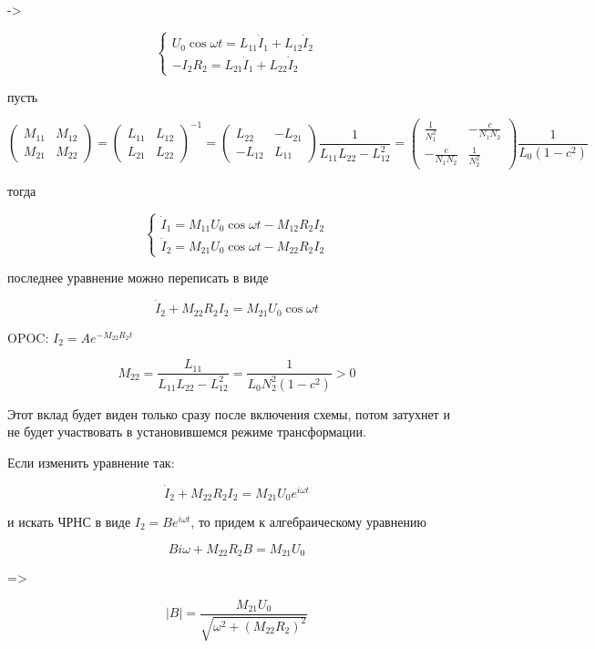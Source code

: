 \documentclass[11pt]{article} %
\begin{document}
->

$$
\begin{cases}
U_0 \cos \omega t=L_{11}\dot I_1+L_{12}\dot I_2\\
-I_2R_2=L_{21}\dot I_1+L_{22}\dot I_2
\end{cases}
$$

пусть 

$$\begin{pmatrix}
M_{11}&M_{12}\\
M_{21}&M_{22}
\end{pmatrix}=
\begin{pmatrix}
L_{11}&L_{12}\\
L_{21}&L_{22}
\end{pmatrix}
^{-1}=
\begin{pmatrix}
L_{22}&-L_{21}\\
-L_{12}&L_{11}
\end{pmatrix}
\frac{1}{L_{11}L_{22}-L_{12}^2}=
\begin{pmatrix}
\frac{1}{N_1^2}&-\frac{c}{N_1N_2}\\
-\frac{c}{N_1N_2}&\frac{1}{N_2^2}
\end{pmatrix}\frac{1}{L_0(1-c^2)}
$$

тогда

$$
\begin{cases}
\dot I_1 = M_{11}U_0 \cos \omega t - M_{12}R_2I_2\\
\dot I_2 = M_{21}U_0 \cos \omega t - M_{22}R_2I_2
\end{cases}
$$

последнее уравнение можно переписать в виде

$$\dot I_2 + M_{22}R_2I_2 = M_{21}U_0 \cos \omega t$$

OPOC: $I_2= Ae^{-M_{22}R_2t}$

$$M_{22}=\frac{L_{11}}{L_{11}L_{22}-L_{12}^2} = 
\frac{1}{L_0N_2^2(1-c^2)}>0$$

Этот вклад будет виден только сразу после включения схемы, потом затухнет и не будет участвовать в установившемся режиме трансформации.

Если изменить уравнение так:

$$\dot I_2 + M_{22}R_2I_2 = M_{21}U_0 e^{i \omega t}$$

и искать ЧРНС  в виде $I_2=Be^{i\omega t}$, то придем к алгебраическому уравнению 

$$Bi\omega+M_{22}R_2B=M_{21}U_0$$

=>

$$|B|=\frac{M_{21}U_0}{\sqrt{\omega^2+(M_{22}R_2)^2}}$$
\end{document}
